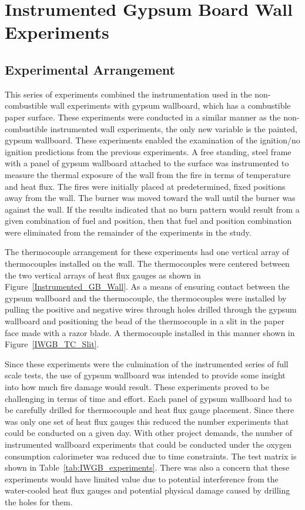 \documentclass[twoside]{uocthesis}
\begin{document}
{\chapter{Instrumented Gypsum Board Wall Experiments}

\section{Experimental Arrangement}
This series of experiments combined the instrumentation used in the non-combustible wall experiments with gypsum wallboard, which has a combustible paper surface. These experiments were conducted in a similar manner as the non-combustible instrumented wall experiments, the only new variable is the painted, gypsum wallboard. These experiments enabled the examination of the ignition/no ignition predictions from the previous experiments.  A free standing, steel frame with a panel of gypsum wallboard attached to the surface was instrumented to measure the thermal exposure of the wall from the fire in terms of temperature and heat flux.  The fires were initially placed at predetermined, fixed positions away from the wall. The burner was moved toward the wall until the burner was against the wall.  If the results indicated that no burn pattern would result from a given combination of fuel and position, then that fuel and position combination were eliminated from the remainder of the experiments in the study.

The thermocouple arrangement for these experiments had one vertical array of thermocouples installed on the wall.  The thermocouples were centered between the two vertical arrays of heat flux gauges as shown in Figure~\ref{Instrumented_GB_Wall}.  As a means of ensuring contact between the gypsum wallboard and the thermocouple, the thermocouples were installed by pulling the positive and negative wires through holes drilled through the gypsum wallboard and positioning the bead of the thermocouple in a slit in the paper face made with a razor blade.  A thermocouple installed in this manner shown in Figure~\ref{IWGB_TC_Slit}.

Since these experiments were the culmination of the instrumented series of full scale tests, the use of gypsum wallboard was intended to provide some insight into how much fire damage would result. These experiments proved to be challenging in terms of time and effort.  Each panel of gypsum wallboard had to be carefully drilled for thermocouple and heat flux gauge placement. Since there was only one set of heat flux gauges this reduced the number experiments that could be conducted on a given day.  With other project demands, the number of instrumented wallboard experiments that could be conducted under the oxygen consumption calorimeter was reduced due to time constraints. The test matrix is shown in Table~\ref{tab:IWGB_experiments}. There was also a concern that these experiments would have limited value due to potential interference from the water-cooled heat flux gauges and potential physical damage caused by drilling the holes for them.

}
\end{document}
